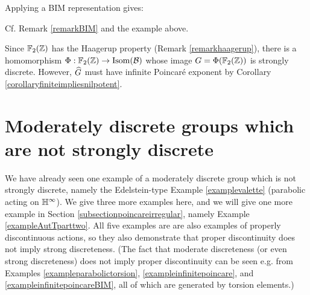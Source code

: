 Applying a BIM representation gives:

\begin{example}[A nonelementary strongly discrete convex-cobounded group acting on $\H^\infty$ and satisfying $\delta = \infty$]
\label{exampleinfinitepoincareBIM}
Cf. Remark \ref{remarkBIM} and the example above.
\end{example}

\begin{example}[A parabolic strongly discrete group $G$ acting on $\H^\infty$ and satisfying $\delta_G = \infty$]
\label{examplehaagerup}
Since $\F_2(\Z)$ has the Haagerup property (Remark \ref{remarkhaagerup}), there is a homomorphism $\Phi:\F_2(\Z)\to\Isom(\BB)$ whose image $G = \Phi(\F_2(\Z))$ is strongly discrete. However, $\widehat G$ must have infinite Poincar\'e exponent by Corollary \ref{corollaryfiniteimpliesnilpotent}.
\end{example}


\section{Moderately discrete groups which are not strongly discrete}
We have already seen one example of a moderately discrete group which is not strongly discrete, namely the Edelstein-type Example \ref{examplevalette} (parabolic acting on $\H^\infty$). We give three more examples here, and we will give one more example in Section \ref{subsectionpoincareirregular}, namely Example \ref{exampleAutTparttwo}. All five examples are are also examples of properly discontinuous actions, so they also demonstrate that proper discontinuity does not imply strong discreteness. (The fact that moderate discreteness (or even strong discreteness) does not imply proper discontinuity can be seen e.g. from Examples \ref{exampleparabolictorsion}, \ref{exampleinfinitepoincare}, and \ref{exampleinfinitepoincareBIM}, all of which are generated by torsion elements.)


